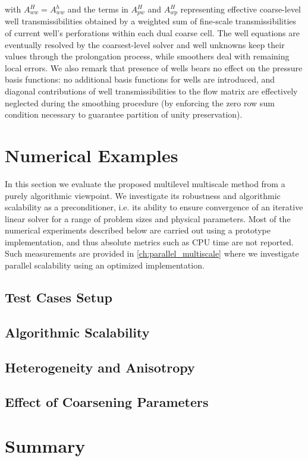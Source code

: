 with $A_{ww}^H = A_{ww}^h$ and the terms in $A_{pw}^H$ and $A_{wp}^H$ representing effective coarse-level well transmissibilities obtained by a weighted sum of fine-scale transmissibilities of current well's perforations within each dual coarse cell.   The well equations are eventually resolved by the coarsest-level solver and well unknowns keep their values through the prolongation process, while smoothers deal with remaining local errors.   We also remark that presence of wells bears no effect on the pressure basis functions: no additional basis functions for wells are introduced, and diagonal contributions of well transmissibilities to the flow matrix are effectively neglected during the smoothing procedure (by enforcing the zero row sum condition necessary to guarantee partition of unity preservation).

\section{Numerical Examples}
\label{sec:msrsb_examples}

In this section we evaluate the proposed multilevel multiscale method from a purely algorithmic viewpoint.   We investigate its robustness and algorithmic scalability as a preconditioner, i.e. its ability to ensure convergence of an iterative linear solver for a range of problem sizes and physical parameters.   Most of the numerical experiments described below are carried out using a prototype implementation, and thus absolute metrics such as CPU time are not reported.   Such measurements are provided in \autoref{ch:parallel_multiscale} where we investigate parallel scalability using an optimized implementation.

\subsection{Test Cases Setup}

\subsection{Algorithmic Scalability}

\subsection{Heterogeneity and Anisotropy}

\subsection{Effect of Coarsening Parameters}

\section{Summary}
\label{sec:msrsb_summary}